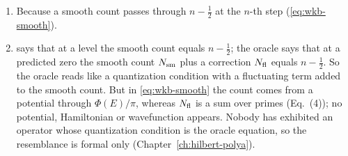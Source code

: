 \begin{enumerate}
\item[26.] Because a smooth count passes through $n-\frac12$ at the $n$-th step (\cref{eq:wkb-smooth}).
\item[27.]  says that at a level the smooth count equals $n-\frac12$; the oracle says that at a predicted zero the smooth count $N_{\mathrm{sm}}$ plus a correction $N_{\mathrm{fl}}$ equals $n-\frac12$. So the oracle reads like a quantization condition with a fluctuating term added to the smooth count. But in \cref{eq:wkb-smooth} the count comes from a potential through $\Phi(E)/\pi$, whereas $N_{\mathrm{fl}}$ is a sum over primes (Eq.~(4)); no potential, Hamiltonian or wavefunction appears. Nobody has exhibited an operator whose quantization condition is the oracle equation, so the resemblance is formal only (Chapter~\ref{ch:hilbert-polya}).
\end{enumerate}
